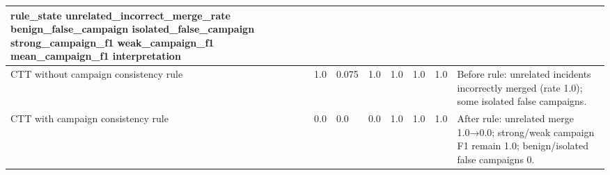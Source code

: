 \begin{tabular}{llllllll}
\hline
\textbf{rule_state} \textbf{unrelated_incorrect_merge_rate} \textbf{benign_false_campaign} \textbf{isolated_false_campaign} \textbf{strong_campaign_f1} \textbf{weak_campaign_f1} \textbf{mean_campaign_f1} \textbf{interpretation} \\
\hline
CTT without campaign consistency rule & 1.0 & 0.075 & 1.0 & 1.0 & 1.0 & 1.0 & Before rule: unrelated incidents incorrectly merged (rate 1.0); some isolated false campaigns. \\
CTT with campaign consistency rule & 0.0 & 0.0 & 0.0 & 1.0 & 1.0 & 1.0 & After rule: unrelated merge 1.0→0.0; strong/weak campaign F1 remain 1.0; benign/isolated false campaigns 0. \\
\hline
\end{tabular}
